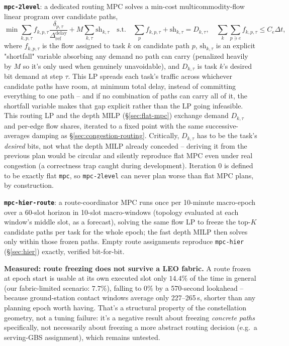 \textbf{\texttt{mpc-2level}}: a dedicated routing MPC solves a min-cost multicommodity-flow linear program over candidate paths,
\begin{equation}
\min \sum_{k,p,\tau} f_{k,p,\tau}
  \frac{\delta_{p,\tau}}{\Delta^{\mathrm{delay}}_{\mathrm{ref}}}
  + M \sum_{k,\tau} \mathrm{sh}_{k,\tau}
\quad \text{s.t.} \quad
\sum_p f_{k,p,\tau} + \mathrm{sh}_{k,\tau} = D_{k,\tau}, \quad
\sum_k \sum_{p \ni e} f_{k,p,\tau} \le C_e \Delta t,
\end{equation}
where $f_{k,p,\tau}$ is the flow assigned to task $k$ on candidate path $p$, $\mathrm{sh}_{k,\tau}$ is an explicit "shortfall" variable absorbing any demand no path can carry (penalized heavily by $M$ so it's only used when genuinely unavoidable), and $D_{k,\tau}$ is task $k$'s desired bit demand at step $\tau$. This LP spreads each task's traffic across whichever candidate paths have room, at minimum total delay, instead of committing everything to one path -- and if no combination of paths can carry all of it, the shortfall variable makes that gap explicit rather than the LP going infeasible. This routing LP and the depth MILP (\S\ref{sec:flat-mpc}) exchange demand $D_{k,\tau}$ and per-edge flow shares, iterated to a fixed point with the same successive-averages damping as \S\ref{sec:congestion-routing}. Critically, $D_{k,\tau}$ has to be the task's \emph{desired} bits, not what the depth MILP already conceded -- deriving it from the previous plan would be circular and silently reproduce flat MPC even under real congestion (a correctness trap caught during development). Iteration 0 is defined to be exactly flat \texttt{mpc}, so \texttt{mpc-2level} can never plan worse than flat MPC plans, by construction.

\textbf{\texttt{mpc-hier-route}}: a route-coordinator MPC runs once per 10-minute macro-epoch over a 60-slot horizon in 10-slot macro-windows (topology evaluated at each window's middle slot, as a forecast), solving the same flow LP to freeze the top-$K$ candidate paths per task for the whole epoch; the fast depth MILP then solves only within those frozen paths. Empty route assignments reproduce \texttt{mpc-hier} (\S\ref{sec:hier}) exactly, verified bit-for-bit.

\textbf{Measured: route freezing does not survive a LEO fabric.} A route frozen at epoch start is usable at its own executed slot only $14.4\%$ of the time in general (our fabric-limited scenario: $7.7\%$), falling to $0\%$ by a 570-second lookahead -- because ground-station contact windows average only 227--265\,s, shorter than any planning epoch worth having. That's a structural property of the constellation geometry, not a tuning failure: it's a negative result about freezing \emph{concrete paths} specifically, not necessarily about freezing a more abstract routing decision (e.g.\ a serving-GBS assignment), which remains untested.

